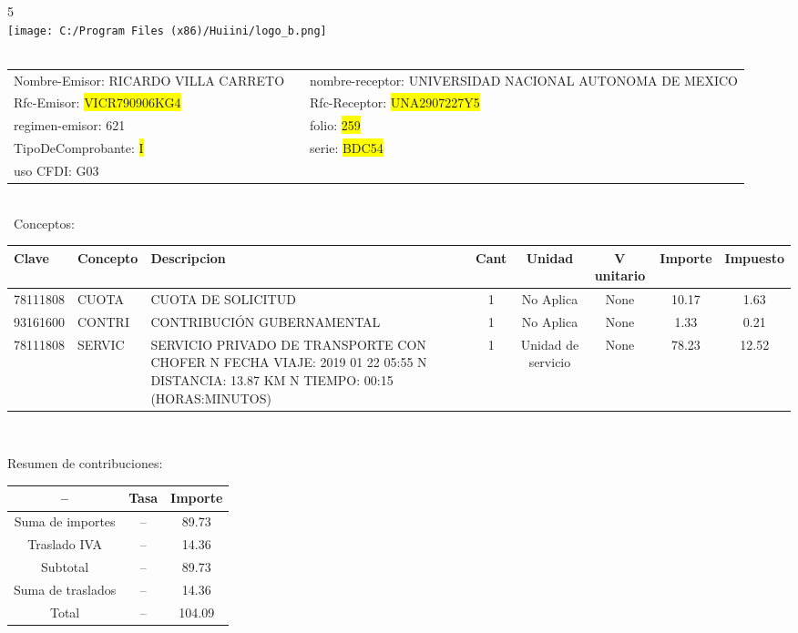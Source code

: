 \documentclass{article}
\begin{document}
\hspace{18cm} 5\\
\texttt{[image: C:/Program Files (x86)/Huiini/logo\_b.png]}
\bigskip\\\
\begin{tabular}{p{11cm}p{1cm}p{8cm}}

Nombre-Emisor: RICARDO VILLA CARRETO && nombre-receptor: UNIVERSIDAD NACIONAL AUTONOMA DE MEXICO\\

Rfc-Emisor: \colorbox{yellow}{ VICR790906KG4 } & & Rfc-Receptor: \colorbox{yellow}{ UNA2907227Y5 }\\

regimen-emisor: 621 & & folio: \colorbox{yellow}{ 259 }\\

TipoDeComprobante: \colorbox{yellow}{ I } & & serie: \colorbox{yellow}{ BDC54 }\\

uso CFDI: G03\\



\end{tabular}
\bigskip\bigskip\bigskip\\\
Conceptos:\\
\begin{tabular}{|p{1.5cm}|p{3.6cm}|p{3.6cm}|c|c|c|c|c|}
\hline
Clave & Concepto & Descripcion & Cant & Unidad & V unitario & Importe & Impuesto \\
\hline

78111808 & CUOTA  & CUOTA DE SOLICITUD & 1 & No Aplica & None & 10.17 &  1.63 \\
\hline

93161600 & CONTRI & CONTRIBUCIÓN GUBERNAMENTAL & 1 & No Aplica & None & 1.33 &  0.21 \\
\hline

78111808 & SERVIC & SERVICIO PRIVADO DE TRANSPORTE CON CHOFER  N FECHA VIAJE: 2019 01 22 05:55  N DISTANCIA: 13.87 KM  N TIEMPO: 00:15 (HORAS:MINUTOS) & 1 & Unidad de servicio & None & 78.23 &  12.52 \\
\hline

\end{tabular}\\
\bigskip
\begin{center}
Resumen de contribuciones:\\
\bigskip
\begin{tabular}{|c|c|c|}
\hline
 -- & Tasa & Importe\\
\hline

Suma de importes & -- & 89.73 \\
\hline

Traslado IVA & -- & 14.36 \\
\hline

Subtotal  & -- & 89.73 \\
\hline

Suma de traslados & -- & 14.36 \\
\hline

Total  & -- & 104.09 \\
\hline

\end{tabular}
\end{center}
\end{document}
